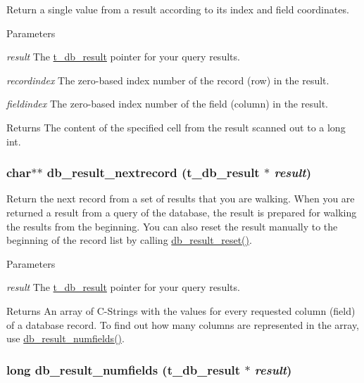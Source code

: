 Return a single value from a result according to its index and field coordinates. 
\begin{DoxyParams}{Parameters}
\item[{\em result}]The \hyperlink{group__database_gae34db00cb98960e94b5ca58a7c21c362}{t\_\-db\_\-result} pointer for your query results. \item[{\em recordindex}]The zero-\/based index number of the record (row) in the result. \item[{\em fieldindex}]The zero-\/based index number of the field (column) in the result. \end{DoxyParams}
\begin{DoxyReturn}{Returns}
The content of the specified cell from the result scanned out to a long int. 
\end{DoxyReturn}
\hypertarget{group__database_ga66fb4403eeb6e44ddd3038c9df863ef8}{
\subsubsection[{db\_\-result\_\-nextrecord}]{\setlength{\rightskip}{0pt plus 5cm}char$\ast$$\ast$ db\_\-result\_\-nextrecord ({\bf t\_\-db\_\-result} $\ast$ {\em result})}}
\label{group__database_ga66fb4403eeb6e44ddd3038c9df863ef8}


Return the next record from a set of results that you are walking. When you are returned a result from a query of the database, the result is prepared for walking the results from the beginning. You can also reset the result manually to the beginning of the record list by calling \hyperlink{group__database_gad0d384ab3ba04958d982cede2cffa043}{db\_\-result\_\-reset()}.


\begin{DoxyParams}{Parameters}
\item[{\em result}]The \hyperlink{group__database_gae34db00cb98960e94b5ca58a7c21c362}{t\_\-db\_\-result} pointer for your query results. \end{DoxyParams}
\begin{DoxyReturn}{Returns}
An array of C-\/Strings with the values for every requested column (field) of a database record. To find out how many columns are represented in the array, use \hyperlink{group__database_ga5bf778c6ba6cc859c41d18a2d887bd7b}{db\_\-result\_\-numfields()}. 
\end{DoxyReturn}
\hypertarget{group__database_ga5bf778c6ba6cc859c41d18a2d887bd7b}{
\subsubsection[{db\_\-result\_\-numfields}]{\setlength{\rightskip}{0pt plus 5cm}long db\_\-result\_\-numfields ({\bf t\_\-db\_\-result} $\ast$ {\em result})}}
\label{group__database_ga5bf778c6ba6cc859c41d18a2d887bd7b}


